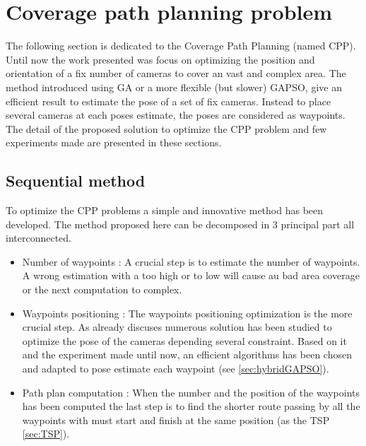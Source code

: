 \chapter{Coverage path planning problem} 


\minitoc

The following section is dedicated to the Coverage Path Planning (named CPP). Until now the work presented was focus on optimizing the position and orientation of a fix number of cameras to cover an vast and complex area. 
The method introduced using GA or a more flexible (but slower) GAPSO, give an efficient result to estimate the pose of a set of fix cameras. Instead to place several cameras at each poses estimate, the poses are considered as waypoints. 
The detail of the proposed solution to optimize the CPP problem and few experiments made are presented in these sections.
 

\section{Sequential method}
To optimize the CPP problems a simple and innovative method has been developed. The method proposed here can be decomposed in 3 principal part all interconnected. 
\begin{itemize}
	\item Number of waypoints : 
	A crucial step is to estimate the number of waypoints. A wrong estimation with a too high or to low will cause au  bad area coverage or the next computation to complex.
	\item Waypoints positioning : 
	The waypoints positioning optimization is the more crucial step. As already discuses numerous solution has been studied to optimize the pose of the cameras depending several constraint. Based on it and the experiment made until now, an efficient algorithms has been chosen and adapted to pose estimate each waypoint (see \ref{sec:hybridGAPSO}). 
	\item  Path plan computation : 
	 When the number and the position of the waypoints has been computed the last step is to find the shorter route  passing by all the waypoints with must start and finish at the same position (as the TSP \ref{sec:TSP}).
	
\end{itemize}

